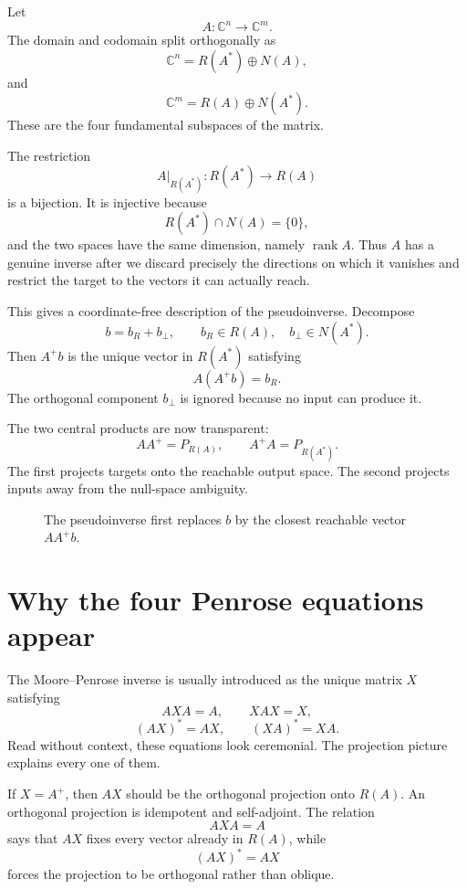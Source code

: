 Let
\[
  A:\mathbb C^n\longrightarrow\mathbb C^m.
\]
The domain and codomain split orthogonally as
\[
  \mathbb C^n
  =R(A^*)\oplus N(A),
\]
and
\[
  \mathbb C^m
  =R(A)\oplus N(A^*).
\]
These are the four fundamental subspaces of the matrix.

The restriction
\[
  A\big|_{R(A^*)}:R(A^*)\longrightarrow R(A)
\]
is a bijection.  It is injective because
\[
  R(A^*)\cap N(A)=\{0\},
\]
and the two spaces have the same dimension, namely \(\operatorname{rank}A\).  Thus \(A\) has a genuine inverse after we discard precisely the directions on which it vanishes and restrict the target to the vectors it can actually reach.

This gives a coordinate-free description of the pseudoinverse.  Decompose
\[
  b=b_R+b_\perp,
  \qquad
  b_R\in R(A),
  \quad
  b_\perp\in N(A^*).
\]
Then \(A^+b\) is the unique vector in \(R(A^*)\) satisfying
\[
  A(A^+b)=b_R.
\]
The orthogonal component \(b_\perp\) is ignored because no input can produce it.

The two central products are now transparent:
\[
  AA^+=P_{R(A)},
  \qquad
  A^+A=P_{R(A^*)}.
\]
The first projects targets onto the reachable output space.  The second projects inputs away from the null-space ambiguity.

\begin{figure}[H]
\centering
{}
\caption{The pseudoinverse first replaces \(b\) by the closest reachable vector \(AA^+b\).}
\end{figure}

\section{Why the four Penrose equations appear}

The Moore--Penrose inverse is usually introduced as the unique matrix \(X\) satisfying
\[
  AXA=A,
  \qquad
  XAX=X,
\]
\[
  (AX)^*=AX,
  \qquad
  (XA)^*=XA.
\]
Read without context, these equations look ceremonial.  The projection picture explains every one of them.

If \(X=A^+\), then \(AX\) should be the orthogonal projection onto \(R(A)\).  An orthogonal projection is idempotent and self-adjoint.  The relation
\[
  AXA=A
\]
says that \(AX\) fixes every vector already in \(R(A)\), while
\[
  (AX)^*=AX
\]
forces the projection to be orthogonal rather than oblique.

